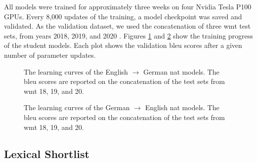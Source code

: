 All models were trained for approximately three weeks on four Nvidia Tesla P100
GPUs. Every 8,000 updates of the training, a model checkpoint was saved and
validated. As the validation dataset, we used the concatenation of three
\ac{wmt} test sets, from years 2018, 2019, and 2020
\citep{bojar-etal-2018-findings, barrault-etal-2019-findings,
  barrault-etal-2020-findings}.  Figures \ref{fig:ende-learning-curves} and
\ref{fig:deen-learning-curves} show the training progress of the student
models. Each plot shows the validation \acs{bleu} scores after a given number
of parameter updates.

\begin{figure}
  \centering
  

  \caption{The learning curves of the English $\rightarrow$ German \ac{nat}
    models. The \acs{bleu} scores are reported on the concatenation of the test
    sets from \acs{wmt} 18, 19, and 20.}%
  \label{fig:ende-learning-curves}
\end{figure}

\begin{figure}
  \centering
  

  \caption{The learning curves of the German $\rightarrow$ English \ac{nat}
    models. The \acs{bleu} scores are reported on the concatenation of the test
    sets from \acs{wmt} 18, 19, and 20.}%
  \label{fig:deen-learning-curves}
\end{figure}

\subsection{Lexical Shortlist}
\label{subsec:exp:shortlist}



